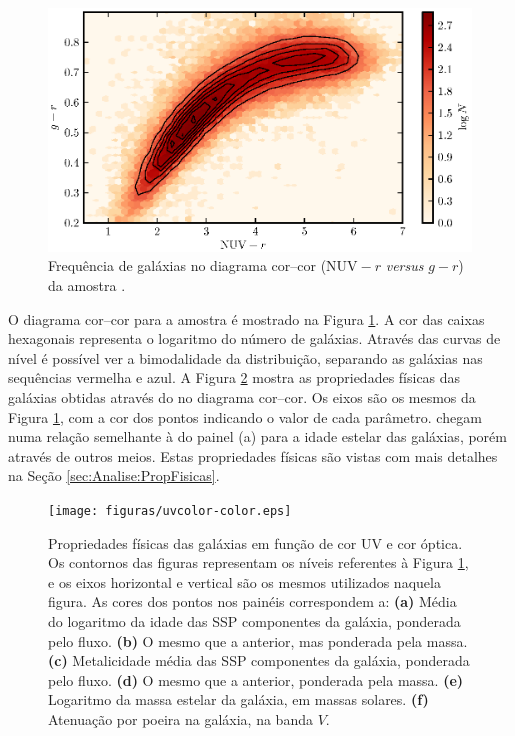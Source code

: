 \begin{figure}
	\includegraphics{figuras/uvcolor-color-density.eps}
	\caption[Frequência de galáxias no diagrama cor--cor.]
	{Frequência de galáxias no diagrama cor--cor ($\mathrm{NUV}-r$ {\em versus}
	$g-r$) da amostra \starlightUV.}
	\label{fig:DensityColor}
\end{figure}

O diagrama cor--cor para a amostra \starlightUV é mostrado na Figura
\ref{fig:DensityColor}. A cor das caixas hexagonais representa o logaritmo do
número de galáxias. Através das curvas de nível é possível ver a bimodalidade da
distribuição, separando as galáxias nas sequências vermelha e azul. A Figura
\ref{fig:ColorStarlightParam} mostra as propriedades físicas das galáxias
obtidas através do \starlight no diagrama cor--cor. Os eixos são os mesmos da
Figura \ref{fig:DensityColor}, com a cor dos pontos indicando o valor de cada
parâmetro. \citeauthor{Chilingarian2011} chegam numa relação semelhante à do
painel (a) para a idade estelar das galáxias, porém através de outros meios.
Estas propriedades físicas são vistas com mais detalhes na Seção
\ref{sec:Analise:PropFisicas}.

\begin{figure}
	\texttt{[image: figuras/uvcolor-color.eps]}
	\caption[Diagrama cor--cor para os diversos parâmetros \starlight.]
	{Propriedades físicas das galáxias em função de cor UV e cor óptica. Os
	contornos das figuras representam os níveis referentes à Figura
	\ref{fig:DensityColor}, e os eixos horizontal e vertical são os mesmos
	utilizados naquela figura. As cores dos pontos nos painéis correspondem a:
	\textbf{(a)} Média do logaritmo da idade das SSP componentes da galáxia,
	ponderada pelo fluxo. \textbf{(b)} O mesmo que a anterior, mas ponderada pela
	massa. \textbf{(c)} Metalicidade média das SSP componentes da galáxia,
	ponderada pelo fluxo. \textbf{(d)} O mesmo que a anterior, ponderada pela
	massa. \textbf{(e)} Logaritmo da massa estelar da galáxia, em massas solares.
	\textbf{(f)} Atenuação por poeira na galáxia, na banda $V$.}
	\label{fig:ColorStarlightParam}
\end{figure}



